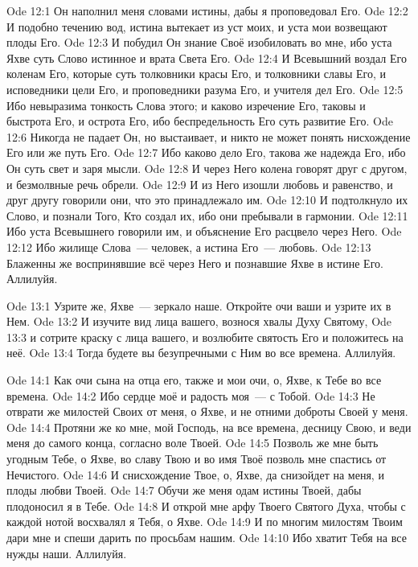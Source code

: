 \vs Ode 12:1
Он наполнил
меня словами истины, дабы я проповедовал Его.
\vs Ode 12:2
И подобно
течению вод, истина вытекает из уст моих, и уста мои возвещают плоды Его.
\vs Ode 12:3
И побудил Он
знание Своё изобиловать во мне, ибо уста Яхве суть Слово истинное и врата Света
Его.
\vs Ode 12:4
И Всевышний
воздал Его коленам Его, которые суть толковники красы Его, и толковники славы
Его, и исповедники цели Его, и проповедники разума Его, и учителя дел Его.
\vs Ode 12:5
Ибо невыразима
тонкость Слова этого; и каково изречение Его, таковы и быстрота Его, и острота
Его, ибо беспредельность Его суть развитие Его.
\vs Ode 12:6
Никогда не
падает Он, но выстаивает, и никто не может понять нисхождение Его или же путь
Его.
\vs Ode 12:7
Ибо каково
дело Его, такова же надежда Его, ибо Он суть свет и заря мысли.
\vs Ode 12:8
И через Него
колена говорят друг с другом, и безмолвные речь обрели.
\vs Ode 12:9
И из Него
изошли любовь и равенство, и друг другу говорили они, что это принадлежало им.
\vs Ode 12:10
И подтолкнуло
их Слово, и познали Того, Кто создал их, ибо они пребывали в гармонии.
\vs Ode 12:11
Ибо уста
Всевышнего говорили им, и объяснение Его расцвело через Него.
\vs Ode 12:12
Ибо жилище
Слова~--- человек, а истина Его~--- любовь.
\vs Ode 12:13
Блаженны же
воспринявшие всё через Него и познавшие Яхве в истине Его.
Аллилуйя.

\vs Ode 13:1
Узрите же,
Яхве~--- зеркало наше. Откройте очи ваши и узрите их в Нем.
\vs Ode 13:2
И изучите вид
лица вашего, вознося хвалы Духу Святому,
\vs Ode 13:3
и сотрите
краску с лица вашего, и возлюбите святость Его и положитесь на неё.
\vs Ode 13:4
Тогда будете
вы безупречными с Ним во все времена.
Аллилуйя.

\vs Ode 14:1
Как очи сына
на отца его, также и мои очи, о, Яхве, к Тебе во все времена.
\vs Ode 14:2
Ибо сердце моё
и радость моя~--- с Тобой.
\vs Ode 14:3
Не отврати же
милостей Своих от меня, о Яхве, и не отними доброты Своей у меня.
\vs Ode 14:4
Протяни же ко
мне, мой Господь, на все времена, десницу Свою, и веди меня до самого конца,
согласно воле Твоей.
\vs Ode 14:5
Позволь же мне
быть угодным Тебе, о Яхве, во славу Твою и во имя Твоё позволь мне спастись от
Нечистого.
\vs Ode 14:6
И снисхождение
Твое, о, Яхве, да снизойдет на меня, и плоды любви Твоей.
\vs Ode 14:7
Обучи же меня
одам истины Твоей, дабы плодоносил я в Тебе.
\vs Ode 14:8
И открой мне
арфу Твоего Святого Духа, чтобы с каждой нотой восхвалял я Тебя, о Яхве.
\vs Ode 14:9
И по многим
милостям Твоим дари мне и спеши дарить по просьбам нашим.
\vs Ode 14:10
Ибо хватит
Тебя на все нужды наши.
Аллилуйя.

